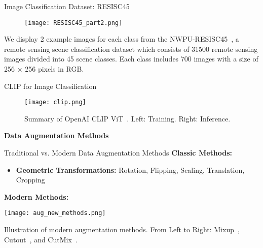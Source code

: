 \begin{refsection}
  \begin{frame}{Image Classification Dataset: RESISC45}
    \begin{figure}
      \centering
      \texttt{[image: RESISC45\_part2.png]}
    \end{figure}
    \scriptsize
    We display 2 example images for each class from the NWPU-RESISC45~\parencite{Cheng2017}, a remote sensing scene classification dataset which consists of 31500 remote sensing images divided into 45 scene classes. Each class includes 700 images with a size of 256 × 256 pixels in RGB.
    \bottomleftrefs
  \end{frame}
\end{refsection}

\begin{refsection}
  \begin{frame}{CLIP for Image Classification}
    \begin{figure}
      \centering
      \texttt{[image: clip.png]}
      \caption{\scriptsize Summary of OpenAI CLIP ViT~\parencite{radfordLearningTransferableVisual2021}. Left: Training. Right: Inference. }
    \end{figure}
    \bottomleftrefs
  \end{frame}
\end{refsection}

\begin{refsection}
  \begin{frame}
    \centering
    \vspace{2.5cm}
    {\LARGE \textbf{Data Augmentation Methods}}
  \end{frame}
\end{refsection}

\begin{refsection}
  \begin{frame}{Traditional vs. Modern Data Augmentation Methods}
    \textbf{Classic Methods:}
    \begin{itemize}
      \item \textbf{Geometric Transformations:} Rotation, Flipping, Scaling, Translation, Cropping
    \end{itemize}
    \textbf{Modern Methods:}

    \centering
    \texttt{[image: aug\_new\_methods.png]}

    \scriptsize
    Illustration of modern augmentation methods. From Left to Right: Mixup~\parencite{zhangMixupEMPIRICALRISK2018}, Cutout~\parencite{devriesImprovedRegularizationConvolutional2017}, and CutMix~\parencite{yunCutMixRegularizationStrategy2019}.

    \bottomleftrefs
  \end{frame}
\end{refsection}

